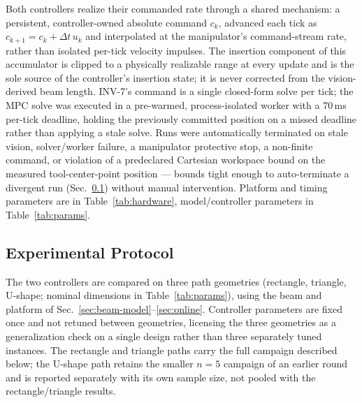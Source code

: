 \documentclass[journal]{IEEEtran}
\begin{document}
Both controllers realize their commanded rate through a shared mechanism:
a persistent, controller-owned absolute command $c_k$, advanced each tick
as $c_{k+1}=c_k+\Delta t\,u_k$ and interpolated at the manipulator's
command-stream rate, rather than isolated per-tick velocity impulses. The
insertion component of this accumulator is clipped to a physically
realizable range at every update and is the sole source of the
controller's insertion state; it is never corrected from the
vision-derived beam length. INV-7's command is a single closed-form
solve per tick; the MPC solve was executed in a pre-warmed,
process-isolated worker with a 70\,ms per-tick deadline, holding the
previously committed position on a missed deadline rather than applying a
stale solve. Runs were automatically terminated on stale vision,
solver/worker failure, a manipulator protective stop, a non-finite
command, or violation of a predeclared Cartesian workspace bound on the
measured tool-center-point position --- bounds tight enough to
auto-terminate a divergent run (Sec.~\ref{sec:protocol}) without manual
intervention. Platform and timing parameters are in
Table~\ref{tab:hardware}, model/controller parameters in
Table~\ref{tab:params}.

\subsection{Experimental Protocol}
\label{sec:protocol}

The two controllers are compared on three path geometries (rectangle,
triangle, U-shape; nominal dimensions in Table~\ref{tab:params}), using
the beam and platform of Sec.~\ref{sec:beam-model}--\ref{sec:online}.
Controller parameters are fixed once and not retuned between geometries,
licensing the three geometries as a generalization check on a single
design rather than three separately tuned instances. The rectangle and
triangle paths carry the full campaign described below; the U-shape path
retains the smaller $n=5$ campaign of an earlier round and is reported
separately with its own sample size, not pooled with the rectangle/triangle
results.
\end{document}
